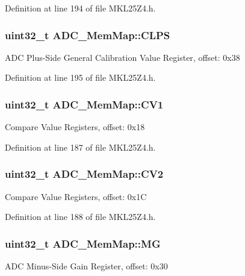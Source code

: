 Definition at line 194 of file M\+K\+L25\+Z4.\+h.

\subsubsection[{\texorpdfstring{C\+L\+PS}{CLPS}}]{\setlength{\rightskip}{0pt plus 5cm}uint32\+\_\+t A\+D\+C\+\_\+\+Mem\+Map\+::\+C\+L\+PS}\hypertarget{struct_a_d_c___mem_map_a6c8a55400c2b32d7018d37b23a6f3ec1}{}\label{struct_a_d_c___mem_map_a6c8a55400c2b32d7018d37b23a6f3ec1}
A\+DC Plus-\/\+Side General Calibration Value Register, offset\+: 0x38 

Definition at line 195 of file M\+K\+L25\+Z4.\+h.

\subsubsection[{\texorpdfstring{C\+V1}{CV1}}]{\setlength{\rightskip}{0pt plus 5cm}uint32\+\_\+t A\+D\+C\+\_\+\+Mem\+Map\+::\+C\+V1}\hypertarget{struct_a_d_c___mem_map_af687bec25a698b31731350c05cd5ba05}{}\label{struct_a_d_c___mem_map_af687bec25a698b31731350c05cd5ba05}
Compare Value Registers, offset\+: 0x18 

Definition at line 187 of file M\+K\+L25\+Z4.\+h.

\subsubsection[{\texorpdfstring{C\+V2}{CV2}}]{\setlength{\rightskip}{0pt plus 5cm}uint32\+\_\+t A\+D\+C\+\_\+\+Mem\+Map\+::\+C\+V2}\hypertarget{struct_a_d_c___mem_map_acf6745fccc765451358e179f7131e645}{}\label{struct_a_d_c___mem_map_acf6745fccc765451358e179f7131e645}
Compare Value Registers, offset\+: 0x1C 

Definition at line 188 of file M\+K\+L25\+Z4.\+h.

\subsubsection[{\texorpdfstring{MG}{MG}}]{\setlength{\rightskip}{0pt plus 5cm}uint32\+\_\+t A\+D\+C\+\_\+\+Mem\+Map\+::\+MG}\hypertarget{struct_a_d_c___mem_map_ae615bad0b39c73a03fdebeb83f4beb91}{}\label{struct_a_d_c___mem_map_ae615bad0b39c73a03fdebeb83f4beb91}
A\+DC Minus-\/\+Side Gain Register, offset\+: 0x30 

